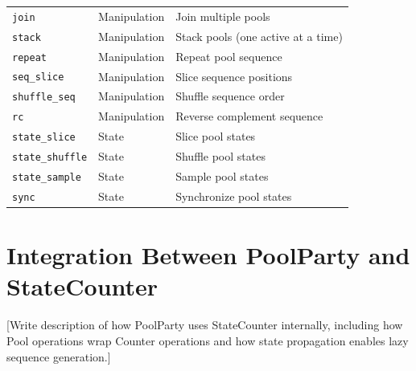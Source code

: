 \documentclass[11pt]{article}
\begin{document}
\begin{longtable}{@{}llp{7cm}@{}}
\texttt{join} & Manipulation & Join multiple pools \\
\texttt{stack} & Manipulation & Stack pools (one active at a time) \\
\texttt{repeat} & Manipulation & Repeat pool sequence \\
\texttt{seq_slice} & Manipulation & Slice sequence positions \\
\texttt{shuffle_seq} & Manipulation & Shuffle sequence order \\
\texttt{rc} & Manipulation & Reverse complement sequence \\
\addlinespace

\texttt{state_slice} & State & Slice pool states \\
\texttt{state_shuffle} & State & Shuffle pool states \\
\texttt{state_sample} & State & Sample pool states \\
\texttt{sync} & State & Synchronize pool states \\

\end{longtable}



\section{Integration Between PoolParty and StateCounter}
\label{sec:integration}

%

[Write description of how PoolParty uses StateCounter internally,
including how Pool operations wrap Counter operations and how 
state propagation enables lazy sequence generation.]


\end{document}
